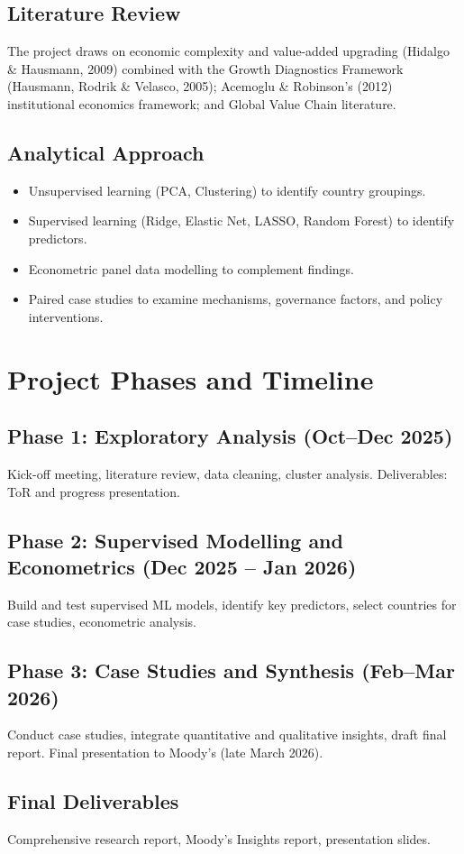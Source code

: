 \documentclass[12pt,a4paper]{report}
\begin{document}
\subsection*{Literature Review}

The project draws on economic complexity and value-added upgrading (Hidalgo \& Hausmann, 2009) combined with the Growth Diagnostics Framework (Hausmann, Rodrik \& Velasco, 2005); Acemoglu \& Robinson's (2012) institutional economics framework; and Global Value Chain literature.

\subsection*{Analytical Approach}

\begin{itemize}
\item Unsupervised learning (PCA, Clustering) to identify country groupings.
\item Supervised learning (Ridge, Elastic Net, LASSO, Random Forest) to identify predictors.
\item Econometric panel data modelling to complement findings.
\item Paired case studies to examine mechanisms, governance factors, and policy interventions.
\end{itemize}

\section*{Project Phases and Timeline}

\subsection*{Phase 1: Exploratory Analysis (Oct--Dec 2025)}

Kick-off meeting, literature review, data cleaning, cluster analysis. Deliverables: ToR and progress presentation.

\subsection*{Phase 2: Supervised Modelling and Econometrics (Dec 2025 -- Jan 2026)}

Build and test supervised ML models, identify key predictors, select countries for case studies, econometric analysis.

\subsection*{Phase 3: Case Studies and Synthesis (Feb--Mar 2026)}

Conduct case studies, integrate quantitative and qualitative insights, draft final report. Final presentation to Moody's (late March 2026).

\subsection*{Final Deliverables}

Comprehensive research report, Moody's Insights report, presentation slides.
\end{document}
